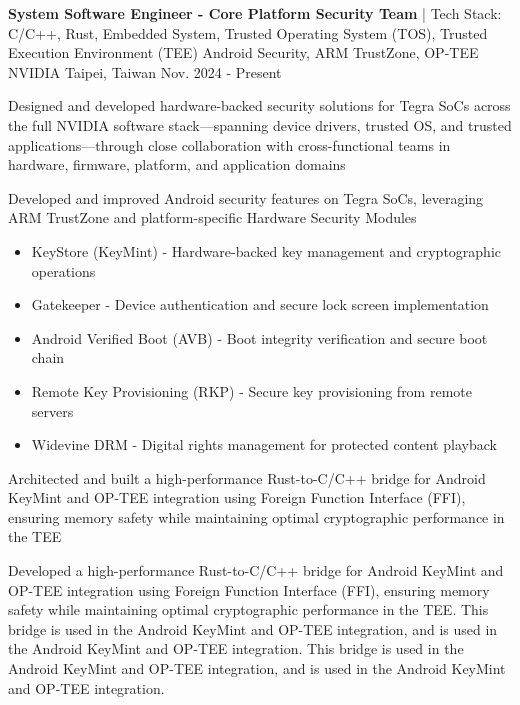 

\begin{cventries}

  \cventry
    {\textbf {System Software Engineer - Core Platform Security Team} | \color{awesome} Tech Stack: C/C++, Rust, Embedded System, Trusted Operating System (TOS), Trusted Execution Environment (TEE) Android Security, ARM TrustZone, OP-TEE} %
    {NVIDIA} %
    {Taipei, Taiwan} %
    {Nov. 2024 - Present} %
    {
      \begin{cvitems} %
        \item {Designed and developed hardware-backed security solutions for Tegra SoCs across the full NVIDIA software stack—spanning device drivers, trusted OS, and trusted applications—through close collaboration with cross-functional teams in hardware, firmware, platform, and application domains}
        \item {Developed and improved Android security features on Tegra SoCs, leveraging ARM TrustZone and platform-specific Hardware Security Modules}
        \begin{itemize}
          \item KeyStore (KeyMint) - Hardware-backed key management and cryptographic operations
          \item Gatekeeper - Device authentication and secure lock screen implementation
          \item Android Verified Boot (AVB) - Boot integrity verification and secure boot chain
          \item Remote Key Provisioning (RKP) - Secure key provisioning from remote servers
          \item Widevine DRM - Digital rights management for protected content playback
        \end{itemize}
        \item {Architected and built a high-performance Rust-to-C/C++ bridge for Android KeyMint and OP-TEE integration using Foreign Function Interface (FFI), ensuring memory safety while maintaining optimal cryptographic performance in the TEE}
        \item {Developed a high-performance Rust-to-C/C++ bridge for Android KeyMint and OP-TEE integration using Foreign Function Interface (FFI), ensuring memory safety while maintaining optimal cryptographic performance in the TEE. This bridge is used in the Android KeyMint and OP-TEE integration, and is used in the Android KeyMint and OP-TEE integration. This bridge is used in the Android KeyMint and OP-TEE integration, and is used in the Android KeyMint and OP-TEE integration.}
      \end{cvitems}
    }


\end{cventries}

